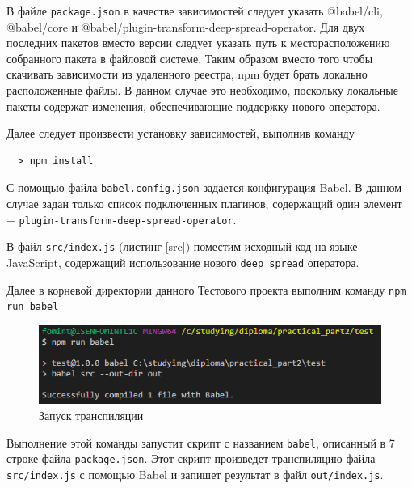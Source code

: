 \documentclass[14pt, a4paper]{article}
\def\code#1{\texttt{#1}} %
\begin{document}
В файле \code{package.json} в качестве зависимостей следует указать @babel/cli, @babel/core и
@babel/plugin-transform-deep-spread-operator. Для двух последних пакетов вместо версии
следует указать путь к месторасположению собранного пакета в файловой системе. Таким образом вместо
того чтобы скачивать зависимости из удаленного реестра, npm будет брать локально расположенные файлы.
В данном случае это необходимо, поскольку локальные пакеты содержат изменения, обеспечивающие поддержку
нового оператора.


Далее следует произвести установку зависимостей, выполнив команду
\begin{lstlisting}
  > npm install
\end{lstlisting}

С помощью файла \code{babel.config.json} задается конфигурация Babel. В данном случае задан только
список подключенных плагинов, содержащий один элемент $-$ \code{plugin-transform-deep-spread-operator}.




В файл \code{src/index.js} (листинг \ref{src}) поместим исходный код на языке JavaScript, содержащий
использование нового \code{deep spread} оператора.



Далее в корневой директории данного Тестового проекта выполним команду \code{npm run babel}

\begin{figure}[H]
  \centering
  \includegraphics[scale=1.0]{img/test_run_babel.PNG}
  \caption{Запуск транспиляции}
  \label{test_run_babel}
\end{figure}

Выполнение этой команды запустит скрипт с названием \code{babel}, описанный в 7 строке файла
\code{package.json}. Этот скрипт произведет транспиляцию файла \code{src/index.js} с помощью Babel и
запишет результат в файл \code{out/index.js}.
\end{document}
